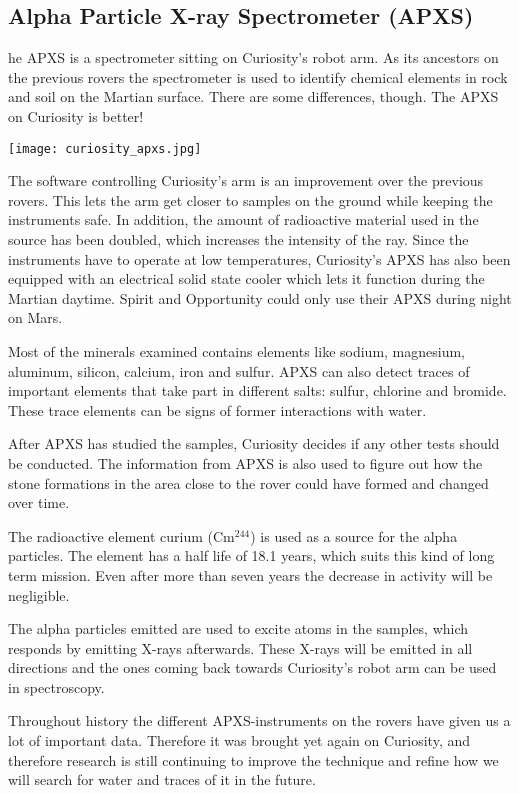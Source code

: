 \subsection{Alpha Particle X-ray Spectrometer (APXS)}
he APXS is a spectrometer sitting on Curiosity's robot arm.
As its ancestors on the previous rovers the spectrometer is used to identify chemical elements in rock and soil on the Martian surface.
There are some differences, though.
The APXS on Curiosity is better!

\begin{center}
	\texttt{[image: curiosity\_apxs.jpg]}
\end{center}

The software controlling Curiosity's arm is an improvement over the previous rovers.
This lets the arm get closer to samples on the ground while keeping the instruments safe.
In addition, the amount of radioactive material used in the source has been doubled, which increases the intensity of the ray.
Since the instruments have to operate at low temperatures, Curiosity's APXS has also been equipped with an electrical solid state cooler which lets it function during the Martian daytime.
Spirit and Opportunity could only use their APXS during night on Mars.

Most of the minerals examined contains elements like sodium, magnesium, aluminum, silicon, calcium, iron and sulfur.
APXS can also detect traces of important elements that take part in different salts: sulfur, chlorine and bromide.
These trace elements can be signs of former interactions with water.

After APXS has studied the samples, Curiosity decides if any other tests should be conducted.
The information from APXS is also used to figure out how the stone formations in the area close to the rover could have formed and changed over time.

The radioactive element curium (Cm$^{244}$) is used as a source for the alpha particles.
The element has a half life of 18.1 years, which suits this kind of long term mission.
Even after more than seven years the decrease in activity will be negligible.

The alpha particles emitted are used to excite atoms in the samples, which responds by emitting X-rays afterwards.
These X-rays will be emitted in all directions and the ones coming back towards Curiosity's robot arm can be used in spectroscopy.

Throughout history the different APXS-instruments on the rovers have given us a lot of important data.
Therefore it was brought yet again on Curiosity, and therefore research is still continuing to improve the technique and refine how we will search for water and traces of it in the future.